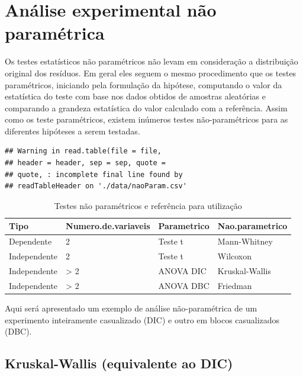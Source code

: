 \documentclass[
]{article}
\begin{document}
\hypertarget{anuxe1lise-experimental-nuxe3o-paramuxe9trica}{%
\section{Análise experimental não paramétrica}\label{anuxe1lise-experimental-nuxe3o-paramuxe9trica}}

Os testes estatísticos não paramétricos não levam em consideração a distribuição original dos resíduos. Em geral eles seguem o mesmo procedimento que os testes paramétricos, iniciando pela formulação da hipótese, computando o valor da estatística do teste com base nos dados obtidos de amostras aleatórias e comparando a grandeza estatística do valor calculado com a referência. Assim como os teste paramétricos, existem inúmeros testes não-paramétricos para as diferentes hipóteses a serem testadas.

\begin{verbatim}
## Warning in read.table(file = file,
## header = header, sep = sep, quote =
## quote, : incomplete final line found by
## readTableHeader on './data/naoParam.csv'
\end{verbatim}

\begin{table}

\caption{\label{tab:unnamed-chunk-173}Testes não paramétricos e referência para utilização}
\centering
\begin{tabular}[t]{l|l|l|l}
\hline
Tipo & Numero.de.variaveis & Parametrico & Nao.parametrico\\
\hline
Dependente & 2 & Teste t & Mann-Whitney\\
\hline
Independente & 2 & Teste t & Wilcoxon\\
\hline
Independente & > 2 & ANOVA DIC & Kruskal-Wallis\\
\hline
Independente & > 2 & ANOVA DBC & Friedman\\
\hline
\end{tabular}
\end{table}

Aqui será apresentado um exemplo de análise não-paramétrica de um experimento inteiramente casualizado (DIC) e outro em blocos casualizados (DBC).

\hypertarget{kruskal-wallis-equivalente-ao-dic}{%
\subsection{Kruskal-Wallis (equivalente ao DIC)}\label{kruskal-wallis-equivalente-ao-dic}}
\end{document}
